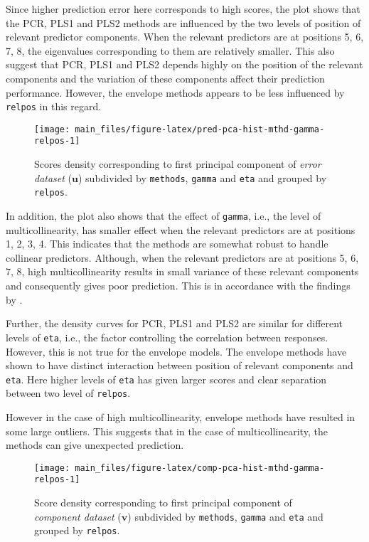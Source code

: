 \documentclass[12pt,3p,authoryear]{elsarticle}
\begin{document}
Since higher prediction error here corresponds to high scores, the plot
shows that the PCR, PLS1 and PLS2 methods are influenced by the two
levels of position of relevant predictor components. When the relevant
predictors are at positions 5, 6, 7, 8, the eigenvalues corresponding to
them are relatively smaller. This also suggest that PCR, PLS1 and PLS2
depends highly on the position of the relevant components and the
variation of these components affect their prediction performance.
However, the envelope methods appears to be less influenced by
\texttt{relpos} in this regard.






\begin{figure}[!htb]
\texttt{[image: main\_files/figure-latex/pred-pca-hist-mthd-gamma-relpos-1]} \caption{Scores density corresponding to first principal
component of \emph{error dataset} (\(\mathbf{u}\)) subdivided by
\texttt{methods}, \texttt{gamma} and \texttt{eta} and grouped by
\texttt{relpos}.}\label{fig:pred-pca-hist-mthd-gamma-relpos}
\end{figure}

In addition, the plot also shows that the effect of \texttt{gamma},
i.e., the level of multicollinearity, has smaller effect when the
relevant predictors are at positions 1, 2, 3, 4. This indicates that the
methods are somewhat robust to handle collinear predictors. Although,
when the relevant predictors are at positions 5, 6, 7, 8, high
multicollinearity results in small variance of these relevant components
and consequently gives poor prediction. This is in accordance with the
findings by \citet{Helland1994b}.

Further, the density curves for PCR, PLS1 and PLS2 are similar for
different levels of \texttt{eta}, i.e., the factor controlling the
correlation between responses. However, this is not true for the
envelope models. The envelope methods have shown to have distinct
interaction between position of relevant components and \texttt{eta}.
Here higher levels of \texttt{eta} has given larger scores and clear
separation between two level of \texttt{relpos}.

However in the case of high multicollinearity, envelope methods have
resulted in some large outliers. This suggests that in the case of
multicollinearity, the methods can give unexpected prediction.






\begin{figure}[!htb]
\texttt{[image: main\_files/figure-latex/comp-pca-hist-mthd-gamma-relpos-1]} \caption{Score density corresponding to first principal component
of \emph{component dataset} (\(\mathbf{v}\)) subdivided by
\texttt{methods}, \texttt{gamma} and \texttt{eta} and grouped by
\texttt{relpos}.}\label{fig:comp-pca-hist-mthd-gamma-relpos}
\end{figure}
\end{document}
